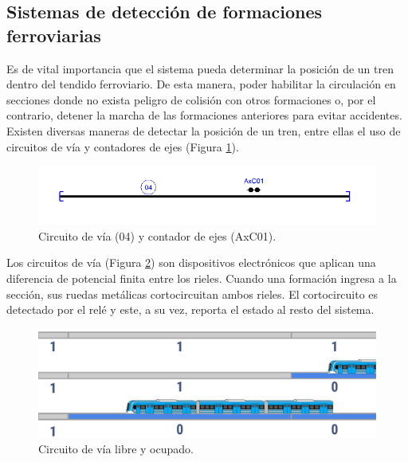 \subsection{Sistemas de detección de formaciones ferroviarias}
    \label{sec:detectors}
    
    Es de vital importancia que el sistema pueda determinar la posición de un tren dentro del tendido ferroviario. De esta manera, poder habilitar la circulación en secciones donde no exista peligro de colisión con otros formaciones o, por el contrario, detener la marcha de las formaciones anteriores para evitar accidentes. Existen diversas maneras de detectar la posición de un tren, entre ellas el uso de circuitos de vía y contadores de ejes (Figura \ref{fig:deteccion_1}). 

    \begin{figure}[H]
        \centering
        \includegraphics[width=1\textwidth]{Figuras/Detector.png}
        \centering\caption{Circuito de vía (04) y contador de ejes (AxC01).}
        \label{fig:deteccion_1}
    \end{figure}

    Los circuitos de vía (Figura \ref{fig:deteccion_2}) son dispositivos electrónicos que aplican una diferencia de potencial finita entre los rieles. Cuando una formación ingresa a la sección, sus ruedas metálicas cortocircuitan ambos rieles. El cortocircuito es detectado por el relé y este, a su vez, reporta el estado al resto del sistema. 

    \begin{figure}[H]
        \centering
        \includegraphics[width=1\textwidth]{Figuras/circuito_via}
        \centering\caption{Circuito de vía libre y ocupado.}
        \label{fig:deteccion_2}
    \end{figure}

